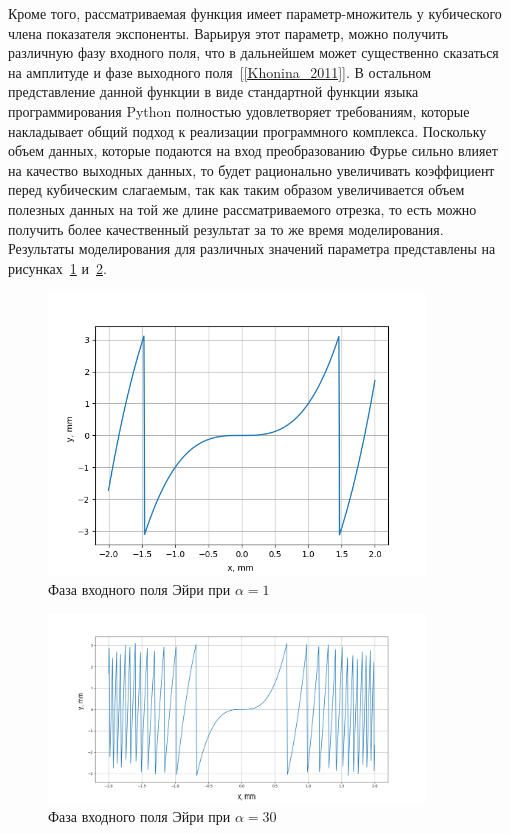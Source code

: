 {    Кроме того, рассматриваемая функция имеет параметр-множитель у
    кубического члена показателя экспоненты. Варьируя этот параметр, можно
    получить различную фазу входного поля, что в дальнейшем может
    существенно сказаться на амплитуде и фазе выходного поля~[\ref{Khonina_2011}]. В остальном
    представление данной функции в виде стандартной функции языка
    программирования Python полностью удовлетворяет требованиям, которые
    накладывает общий подход к реализации программного комплекса.
    Поскольку объем данных, которые подаются на вход преобразованию
    Фурье сильно влияет на качество выходных данных, то будет рационально
    увеличивать коэффициент перед кубическим слагаемым, так как таким образом
    увеличивается объем полезных данных на той же длине рассматриваемого
    отрезка, то есть можно получить более качественный результат за то же время
    моделирования. Результаты моделирования для различных значений параметра представлены на рисунках~\ref{airy_phase} и~\ref{airyphase1}.
    \begin{figure}[H]
        \begin{center}
            \includegraphics[width=10cm]{plots/airyphase}
            \caption{Фаза входного поля Эйри при $\alpha  = 1$}
            \label{airy_phase}
        \end{center}
    \end{figure}

    \begin{figure}[H]
        \begin{center}
            \includegraphics[width=10cm]{plots/airyphase1}
            \caption{  Фаза входного поля Эйри при $\alpha  = 30$}
            \label{airyphase1}
        \end{center}


\end{figure}}
